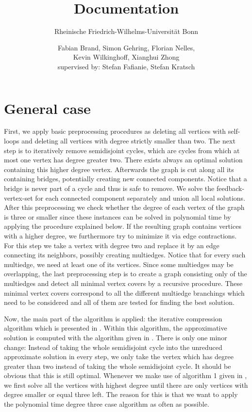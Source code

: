 \documentclass[11pt,a4paper]{scrartcl}
\begin{document}
\title{Documentation}
\subtitle{Rheinische Friedrich-Wilhelms-Universit\"at Bonn}
\author{Fabian Brand, Simon Gehring, Florian Nelles,\\ Kevin Wilkinghoff, Xianghui Zhong\\
	supervised by: Stefan Fafianie, Stefan Kratsch}
\maketitle

\section{General case}
First, we apply basic preprocessing procedures as deleting all vertices with self-loops and deleting all vertices with degree strictly smaller than two. 
The next step is to iteratively remove semidisjoint cycles, which are cycles from which at most one vertex has degree greater two. There exists always an optimal solution containing this higher degree vertex. Afterwards the graph is cut along all its containing bridges, potentially creating new connected components. Notice that a bridge is never part of a cycle and thus is safe to remove. We solve the feedback-vertex-set for each connected component separately and union all local solutions.
After this preprocessing we check whether the degree of each vertex of the graph is three or smaller since these instances can be solved in polynomial time by applying the procedure explained below. 
If the resulting graph contains vertices with a higher degree, we furthermore try to minimize it via edge contractions. For this step we take a vertex with degree two and replace it by an edge connecting its neighbors, possibly creating multiedges. Notice that for every such multiedge, we need at least one of its vertices. Since some multiedges may be overlapping, the last preprocessing step is to create a graph consisting only of the multiedges and detect all minimal vertex covers by a recursive procedure. These minimal vertex covers correspond to all the different multiedge branchings which need to be considered and all of them are tested for finding the best solution.
\par 
Now, the main part of the algorithm is applied: the iterative compression algorithm which is presented in \cite{chen2008}. Within this algorithm, the approximative solution is computed with the algorithm given in \cite{bafna1999}. There is only one minor change: Instead of taking the whole semidisjoint cycle into the unreduced approximate solution in every step, we only take the vertex which has degree greater than two instead of taking the whole semidisjoint cycle. It should be obvious that this is still optimal. Whenever we make use of algorithm 1 given in \cite{chen2008}, we first solve all the vertices with highest degree until there are only vertices with degree smaller or equal three left. The reason for this is that we want to apply the polynomial time degree three case algorithm as often as possible.
\end{document}
